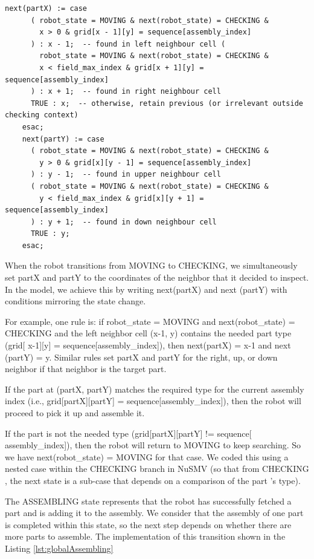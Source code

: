     \begin{lstlisting}[language=NuSMV, caption={Assign for transition from CHECKING state and changing of 
        auxiliary partX and partY variables}, 
    label={lst:globalPartXY}]
    next(partX) := case
      ( robot_state = MOVING & next(robot_state) = CHECKING & 
        x > 0 & grid[x - 1][y] = sequence[assembly_index]
      ) : x - 1;  -- found in left neighbour cell (
        robot_state = MOVING & next(robot_state) = CHECKING & 
        x < field_max_index & grid[x + 1][y] = sequence[assembly_index]
      ) : x + 1;  -- found in right neighbour cell
      TRUE : x;  -- otherwise, retain previous (or irrelevant outside checking context)
    esac;
    next(partY) := case
      ( robot_state = MOVING & next(robot_state) = CHECKING & 
        y > 0 & grid[x][y - 1] = sequence[assembly_index]
      ) : y - 1;  -- found in upper neighbour cell
      ( robot_state = MOVING & next(robot_state) = CHECKING & 
        y < field_max_index & grid[x][y + 1] = sequence[assembly_index]
      ) : y + 1;  -- found in down neighbour cell
      TRUE : y;
    esac;
    \end{lstlisting}

When the robot transitions from MOVING to CHECKING, we simultaneously set 
partX and partY to the coordinates of the neighbor that it decided to 
inspect. In the model, we achieve this by writing next(partX) and next
(partY) with conditions mirroring the state change. 

For example, one rule is: if robot\_state = MOVING and next(robot\_state) = CHECKING and 
the left neighbor cell (x-1, y) contains the needed part type (grid[
x-1][y] = sequence[assembly\_index]), then next(partX) = x-1 and next
(partY) = y. Similar rules set partX and partY for the right, up, 
or down neighbor if that neighbor is the target part. 

If the part at (partX, partY) matches the required type for the current 
assembly index (i.e., grid[partX][partY] = sequence[assembly\_index]), 
then the robot will proceed to pick it up and assemble it.  

If the part is not the needed type (grid[partX][partY] != sequence[
assembly\_index]), then the robot will return to MOVING to keep searching. 
So we have next(robot\_state) = MOVING for that case. We coded this using 
a nested case within the CHECKING branch in NuSMV (so that from CHECKING
, the next state is a sub-case that depends on a comparison of the part
’s type).

The ASSEMBLING state represents that the robot 
has successfully fetched a part and is adding it to the assembly. 
We consider that the assembly of one part is completed within this state,
so the next step depends on whether there are more parts to assemble. 
The implementation of this transition shown in the Listing \ref{lst:globalAssembling}

